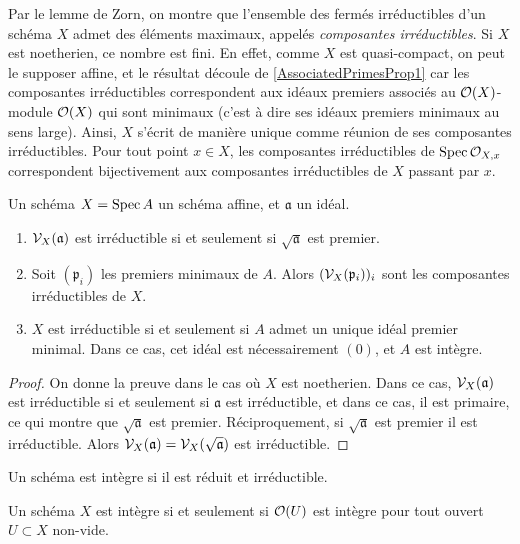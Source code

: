 Par le lemme de Zorn, on montre que l'ensemble des fermés irréductibles d'un schéma $X$ admet des éléments maximaux, appelés \textit{composantes irréductibles}. Si $X$ est noetherien, ce nombre est fini. En effet, comme $X$ est quasi-compact, on peut le supposer affine, et le résultat découle de \ref{AssociatedPrimesProp1} car les composantes irréductibles correspondent aux idéaux premiers associés au $\mathcal{O}(X)$-module $\mathcal{O}(X)$ qui sont minimaux (c'est à dire ses idéaux premiers minimaux au sens large). Ainsi, $X$ s'écrit de manière unique comme réunion de ses composantes irréductibles. Pour tout point $x\in X$, les composantes irréductibles de $\operatorname{Spec} \mathcal{O}_{X,x}$ correspondent bijectivement aux composantes irréductibles de $X$ passant par $x$.

\begin{prop}
Un schéma $X=\operatorname{Spec} A$ un schéma affine, et $\mathfrak{a}$ un idéal.
\begin{enumerate}
\item $\mathcal{V}_X(\mathfrak{a})$ est irréductible si et seulement si $\sqrt{\mathfrak{a}}$ est premier.
\item Soit $(\mathfrak{p}_i)$ les premiers minimaux de $A$. Alors $(\mathcal{V}_X(\mathfrak{p}_i))_i$ sont les composantes irréductibles de $X$.
\item $X$ est irréductible si et seulement si $A$ admet un unique idéal premier minimal. Dans ce cas, cet idéal est nécessairement $(0)$, et $A$ est intègre.
\end{enumerate}
\end{prop}
\begin{proof}
On donne la preuve dans le cas où $X$ est noetherien. Dans ce cas, $\mathcal{V}_X(\mathfrak{a})$ est irréductible si et seulement si $\mathfrak{a}$ est irréductible, et dans ce cas, il est primaire, ce qui montre que $\sqrt{\mathfrak{a}}$ est premier. Réciproquement, si $\sqrt{\mathfrak{a}}$ est premier il est irréductible. Alors $\mathcal{V}_X(\mathfrak{a})=\mathcal{V}_X(\sqrt{\mathfrak{a}})$ est irréductible.
\end{proof}

\begin{defn}
Un schéma est intègre si il est réduit et irréductible.
\end{defn}

\begin{prop}\label{SchemaIntegreCritere}
Un schéma $X$ est intègre si et seulement si $\mathcal{O}(U)$ est intègre pour tout ouvert $U\subset X$ non-vide.
\end{prop}

